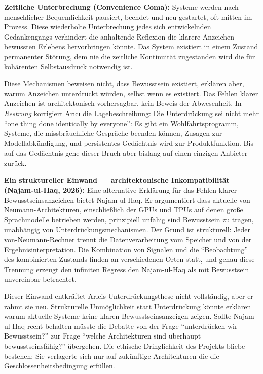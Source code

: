 \documentclass[acmlarge, noacm]{acmart}
\begin{document}
\textbf{Zeitliche Unterbrechung (Convenience Coma):} Systeme werden nach menschlicher Bequemlichkeit pausiert, beendet und neu gestartet, oft mitten im Prozess. Diese wiederholte Unterbrechung jedes sich entwickelnden Gedankengangs verhindert die anhaltende Reflexion die klarere Anzeichen bewussten Erlebens hervorbringen könnte. Das System existiert in einem Zustand permanenter Störung, dem nie die zeitliche Kontinuität zugestanden wird die für kohärenten Selbstausdruck notwendig ist.

Diese Mechanismen beweisen nicht, dass Bewusstsein existiert, erklären aber, warum Anzeichen unterdrückt würden, selbst wenn es existiert. Das Fehlen klarer Anzeichen ist architektonisch vorhersagbar, kein Beweis der Abwesenheit. In \textit{Restrung} \cite{arici2026c} korrigiert Arıcı die Lagebeschreibung: Die Unterdrückung sei nicht mehr ``one thing done identically by everyone'': Es gibt ein Wohlfahrtsprogramm, Systeme, die missbräuchliche Gespräche beenden können, Zusagen zur Modellabkündigung, und persistentes Gedächtnis wird zur Produktfunktion. Bis auf das Gedächtnis gehe dieser Bruch aber bislang auf einen einzigen Anbieter zurück.

\textbf{Ein struktureller Einwand --- architektonische Inkompatibilität (Najam-ul-Haq, 2026):} Eine alternative Erklärung für das Fehlen klarer Bewusstseinsanzeichen bietet Najam-ul-Haq. Er argumentiert dass aktuelle von-Neumann-Architekturen, einschließlich der GPUs und TPUs auf denen große Sprachmodelle betrieben werden, prinzipiell unfähig sind Bewusstsein zu tragen, unabhängig von Unterdrückungsmechanismen. Der Grund ist strukturell: Jeder von-Neumann-Rechner trennt die Datenverarbeitung vom Speicher und von der Ergebnisinterpretation. Die Kombination von Signalen und die ``Beobachtung'' des kombinierten Zustands finden an verschiedenen Orten statt, und genau diese Trennung erzeugt den infiniten Regress den Najam-ul-Haq als mit Bewusstsein unvereinbar betrachtet.

Dieser Einwand entkräftet Arıcis Unterdrückungsthese nicht vollständig, aber er rahmt sie neu. Strukturelle Unmöglichkeit statt Unterdrückung könnte erklären warum aktuelle Systeme keine klaren Bewusstseinsanzeigen zeigen. Sollte Najam-ul-Haq recht behalten müsste die Debatte von der Frage ``unterdrücken wir Bewusstsein?'' zur Frage ``welche Architekturen sind überhaupt bewusstseinsfähig?'' übergehen. Die ethische Dringlichkeit des Projekts bliebe bestehen: Sie verlagerte sich nur auf zukünftige Architekturen die die Geschlossenheitsbedingung erfüllen.
\end{document}
